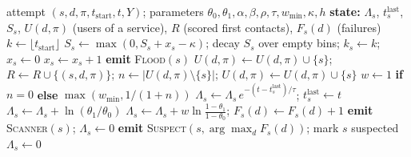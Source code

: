 \documentclass[conference]{IEEEtran}
\begin{document}
\begin{algorithm}[!tbp]
\caption{AIS-SPRT: per resolved initiated attempt}\label{alg:aisprt}
\begin{algorithmic}[1]
\Require attempt $(s,d,\pi,t_{\text{start}},t,Y)$; parameters $\theta_0,\theta_1,\alpha,\beta,\rho,\tau,w_{\min},\kappa,h$
\State \textbf{state:} $\Lambda_s$, $t^{\text{last}}_s$, $S_s$, $U(d,\pi)$ (users of a service), $R$ (scored first contacts), $F_s(d)$ (failures)
\State $k\gets\lfloor t_{\text{start}}\rfloor$ 
 \State $S_s\gets\max(0,S_s+x_s-\kappa)$; decay $S_s$ over empty bins; $k_s\gets k$; $x_s\gets0$ \EndIf
\State $x_s\gets x_s+1$
 \State \textbf{emit} \textsc{Flood}$(s)$ \EndIf
{} \State $U(d,\pi)\gets U(d,\pi)\cup\{s\}$; \Return {} \EndIf
\State $R\gets R\cup\{(s,d,\pi)\}$; \quad $n\gets|U(d,\pi)\setminus\{s\}|$; \quad $U(d,\pi)\gets U(d,\pi)\cup\{s\}$
\State $w\gets 1$ \textbf{if} $n=0$ \textbf{else} $\max(w_{\min},1/(1+n))$
\State $\Lambda_s\gets\Lambda_s\,e^{-(t-t^{\text{last}}_s)/\tau}$; \quad $t^{\text{last}}_s\gets t$
 \State $\Lambda_s\gets\Lambda_s+\ln(\theta_1/\theta_0)$
\Else \State $\Lambda_s\gets\Lambda_s+w\ln\frac{1-\theta_1}{1-\theta_0}$; \quad $F_s(d)\gets F_s(d)+1$ \EndIf
{} \State \textbf{emit} \textsc{Scanner}$(s)$; \quad $\Lambda_s\gets0$
  \State \textbf{emit} \textsc{Suspect}$(s,\arg\max_d F_s(d))$; mark $s$ suspected
 \State $\Lambda_s\gets0$  \EndIf
\end{algorithmic}
\end{algorithm}

\end{document}
